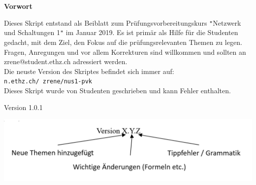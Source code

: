 






 \begin{center}
 	\LARGE\textbf{Vorwort}
 \end{center}
 Dieses Skript entstand als Beiblatt zum Prüfungsvorbereitungskurs \texttt{"}Netzwerk und Schaltungen 1\texttt{"} im Januar 2019.
Es ist primär als Hilfe für die Studenten gedacht, mit dem Ziel, den Fokus auf die prüfungsrelevanten Themen zu legen.
	Fragen, Anregungen und vor allem Korrekturen sind willkommen und sollten an zrene@student.ethz.ch adressiert werden. \\
Die neuste Version des Skriptes befindet sich immer auf: \texttt{n.ethz.ch/~zrene/nus1-pvk}
\\
Dieses Skript wurde von Studenten geschrieben und kann Fehler enthalten.
\begin{center}
	Version 1.0.1
\end{center}
\begin{center}
	\hspace{1cm}
	\includegraphics[scale=0.48]{img/version.png}
\end{center}


\cleardoublepage
{}

\tableofcontents                %

\newpage


